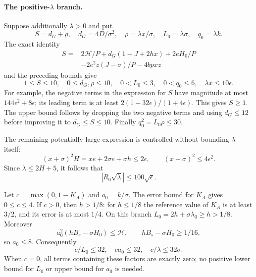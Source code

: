 \paragraph{The positive-$\lambda$ branch.}
Suppose additionally $\lambda>0$ and put
\[
 S=d_G+\rho,\quad d_G=4D/\sigma^2,\quad
 \rho=\lambda x/\sigma,\quad L_0=\lambda\sigma,\quad q_0=\lambda k.
\]
The exact identity
\begin{align*}
 S={}&2\mathcal H/P+d_G(1-J+2hx)+2eH_0/P\\
 &-2e^2z(J-\sigma)/P-4bpxz
\end{align*}
and the preceding bounds give
\begin{equation}\label{eq:positivebounds}
 1\le S\le10,\quad 0\le d_G,\rho\le10,\quad
 0<L_0\le3,\quad 0<q_0\le6,\quad \lambda x\le10\epsilon.
\end{equation}
For example, the negative terms in the expression for $S$ have
magnitude at most $144\epsilon^2+8\epsilon$; its leading term is
at least $2(1-32\epsilon)/(1+4\epsilon)$. This gives $S\ge1$.
The upper bound follows by dropping the two negative terms and
using $d_G\le12$ before improving it to $d_G\le S\le10$.
Finally $q_0^2=L_0\rho\le30$.

The remaining potentially large expression is controlled without
bounding $\lambda$ itself:
\[
 (x+\sigma)^2H=xe+2\sigma e+\sigma h\le2\epsilon,
 \qquad (x+\sigma)^2\le4\epsilon^2.
\]
Since $\lambda\le2H+5$, it follows that
\begin{equation}\label{eq:Rlambda}
 |R_0\sqrt\lambda|\le100\sqrt\epsilon.
\end{equation}

Let $c=\max(0,1-K_A)$ and $a_0=k/\sigma$. The error bound for
$K_A$ gives $0\le c\le4$. If $c>0$, then $h>1/8$: for
$h\le1/8$ the reference value of $K_A$ is at least $3/2$, and its
error is at most $1/4$. On this branch $L_0=2h+\sigma\lambda_0\ge h>1/8$.
Moreover
\[
 a_0^2(hB_s-\sigma H_0)\le\mathcal H,
 \qquad hB_s-\sigma H_0\ge1/16,
\]
so $a_0\le8$. Consequently
\begin{equation}\label{eq:cbounds}
 c/L_0\le32,\quad ca_0\le32,\quad c/\lambda\le32\sigma.
\end{equation}
When $c=0$, all terms containing these factors are exactly zero;
no positive lower bound for $L_0$ or upper bound for $a_0$ is needed.

